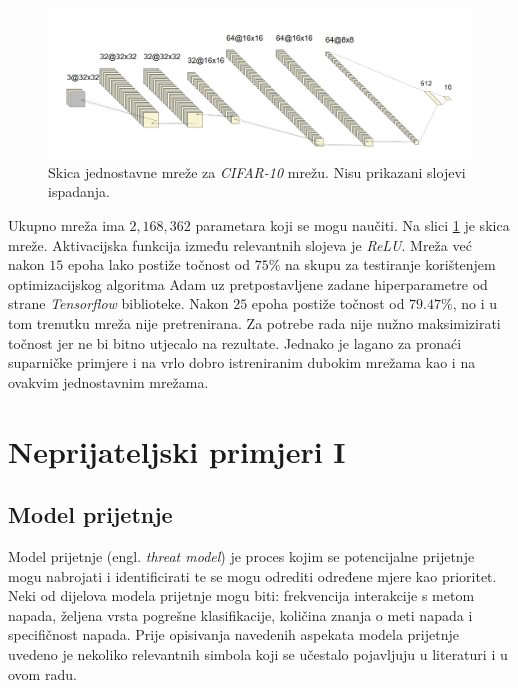 \documentclass[utf8, diplomski]{fer}
\begin{document}
\begin{figure}[H]
\centering
\includegraphics[width=1\textwidth,keepaspectratio]{img/other/toy_cifar10.png}
\caption{Skica jednostavne mreže za \textit{CIFAR-10} mrežu. Nisu prikazani slojevi ispadanja.}
\label{fig:toy_cifar10}
\end{figure}

Ukupno mreža ima $2,168,362$ parametara koji se mogu naučiti. Na slici \ref{fig:toy_cifar10} je skica mreže. Aktivacijska funkcija između relevantnih slojeva je \textit{ReLU}. Mreža već nakon $15$ epoha lako postiže točnost od $75\%$ na skupu za testiranje korištenjem optimizacijskog algoritma Adam\citep{adam} uz pretpostavljene zadane hiperparametre od strane \textit{Tensorflow} biblioteke. Nakon $25$ epoha postiže točnost od $79.47\%$, no i u tom trenutku mreža nije pretrenirana. Za potrebe rada nije nužno maksimizirati točnost jer ne bi bitno utjecalo na rezultate. Jednako je lagano za pronaći suparničke primjere i na vrlo dobro istreniranim dubokim mrežama kao i na ovakvim jednostavnim mrežama.


\chapter{Neprijateljski primjeri I}
\section{Model prijetnje}
Model prijetnje (engl. \textit{threat model}) je proces kojim se potencijalne prijetnje mogu nabrojati i identificirati te se mogu odrediti određene mjere kao prioritet. Neki od dijelova modela prijetnje mogu biti: frekvencija interakcije s metom napada, željena vrsta pogrešne klasifikacije, količina znanja o meti napada i specifičnost napada. Prije opisivanja navedenih aspekata modela prijetnje uvedeno je nekoliko relevantnih simbola koji se učestalo pojavljuju u literaturi i u ovom radu.
\end{document}
